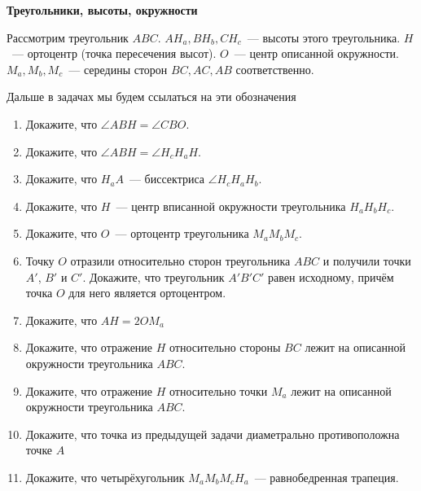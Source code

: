\documentclass{article}
\begin{document}
    \large

    \begin{center}
        \textbf{Треугольники, высоты, окружности}
    \end{center}

    Рассмотрим треугольник $ABC$. $AH_a, BH_b, CH_c$~--- высоты этого треугольника. $H$~--- ортоцентр (точка пересечения высот). $O$~--- центр описанной окружности. $M_a, M_b, M_c$~--- середины сторон $BC, AC, AB$ соответственно.

    Дальше в задачах мы будем ссылаться на эти обозначения


    \begin{enumerate}[label*=\protect\fbox{\arabic{enumi}}]

        \item Докажите, что $\angle ABH = \angle CBO$.

        \item Докажите, что $\angle ABH = \angle H_{c}H_{a}H$.

        \item Докажите, что $H_{a}A$~--- биссектриса $ \angle H_{c}H_{a}H_b$.

        \item Докажите, что $H$~--- центр вписанной окружности треугольника $H_{a}H_{b}H_c$.

        \item Докажите, что $O$~--- ортоцентр треугольника $M_{a}M_{b}M_c$.


        \item Точку $O$ отразили относительно сторон треугольника $ABC$ и получили точки $A'$, $B'$ и $C'$.
        Докажите, что треугольник $A'B'C'$ равен исходному, причём точка $O$ для него является ортоцентром.

        \item Докажите, что  $AH = 2OM_a$

        \item Докажите, что отражение  $H$ относительно стороны $BC$ лежит на описанной окружности треугольника $ABC$.

        \item Докажите, что отражение  $H$ относительно точки $M_a$ лежит на описанной окружности треугольника $ABC$.

        \item Докажите, что точка из предыдущей задачи диаметрально противоположна точке $A$

        \item Докажите, что четырёхугольник  $M_{a}M_{b}M_{c}H_a$~--- равнобедренная трапеция.


\end{enumerate}
\end{document}
